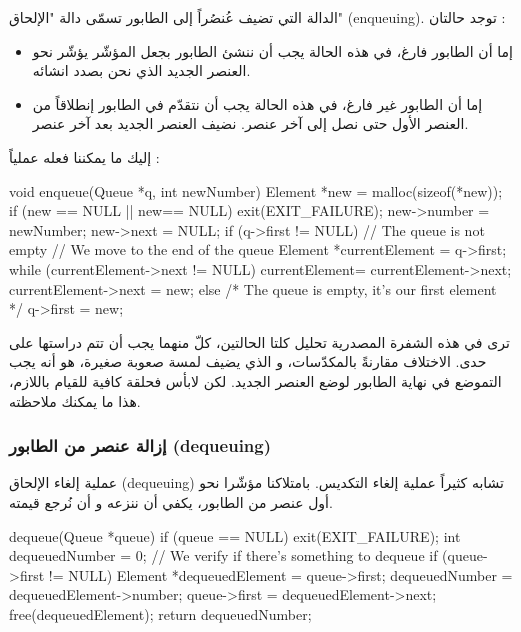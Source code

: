 الدالة التي تضيف عُنصُراً إلى الطابور تسمّى دالة "الإلحاق"
(\textenglish{enqueuing}).
توجد حالتان :

\begin{itemize}
	\item إما أن الطابور فارغ، في هذه الحالة يجب أن ننشئ الطابور بجعل المؤشّر
	يؤشّر نحو العنصر الجديد الذي نحن بصدد انشائه.
	\item إما أن الطابور غير فارغ، في هذه الحالة يجب أن نتقدّم في الطابور إنطلاقاً من العنصر الأول حتى نصل إلى آخر عنصر. نضيف العنصر الجديد بعد آخر عنصر.
\end{itemize}
إليك ما يمكننا فعله عملياً :

\begin{Csource}
void enqueue(Queue *q, int newNumber)
{
	Element *new = malloc(sizeof(*new));
	if (new == NULL || new== NULL)
	{
		exit(EXIT_FAILURE);
	}
	new->number = newNumber;
	new->next = NULL;
	if (q->first != NULL) // The queue is not empty
	{
		// We move to the end of the queue
		Element *currentElement = q->first;
		while (currentElement->next != NULL)
		{
			currentElement= currentElement->next;
		}
		currentElement->next = new;
	}
	else /* The queue is empty, it's our first element */
	{
		q->first = new;
	}
}
\end{Csource}

ترى في هذه الشفرة المصدرية تحليل كلتا الحالتين، كلّ منهما يجب أن تتم دراستها على حدى. الاختلاف مقارنةً بالمكدّسات، و الذي يضيف لمسة صعوبة صغيرة، هو أنه يجب التموضع في نهاية الطابور لوضع العنصر الجديد. لكن لابأس فحلقة
كافية للقيام باللازم، هذا ما يمكنك ملاحظته.

\subsubsection{إزالة عنصر من الطابور (\textenglish{dequeuing})}

عملية إلغاء الإلحاق 
(\textenglish{dequeuing})
تشابه كثيراً عملية إلغاء التكديس. بامتلاكنا مؤشّرا نحو أول عنصر من الطابور، يكفي أن ننزعه و أن نُرجع قيمته.

\begin{Csource}
dequeue(Queue *queue)
{
	if (queue == NULL)
	{
		exit(EXIT_FAILURE);
	}
	int dequeuedNumber = 0;
	// We verify if there's something to dequeue
	if (queue->first != NULL)
	{
		Element *dequeuedElement = queue->first;
		dequeuedNumber = dequeuedElement->number;
		queue->first = dequeuedElement->next;
		free(dequeuedElement);
	}
	return dequeuedNumber;
}
\end{Csource}

